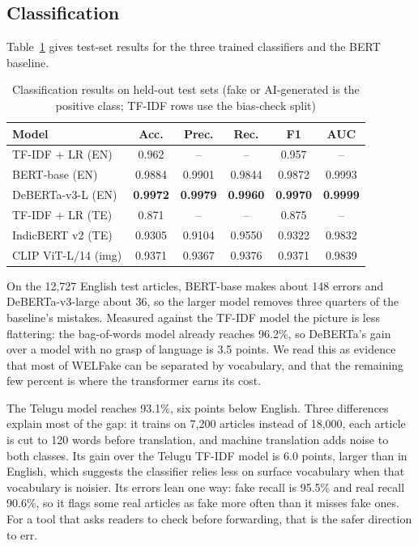 \documentclass[conference]{IEEEtran}
\begin{document}
\subsection{Classification}
Table~\ref{tab:cls} gives test-set results for the three trained classifiers and the BERT baseline.

\begin{table}[t]
\caption{Classification results on held-out test sets (fake or AI-generated is the positive class; TF-IDF rows use the bias-check split)}
\label{tab:cls}
\centering
\footnotesize
\setlength{\tabcolsep}{3.2pt}
\begin{tabular}{@{}lccccc@{}}
\toprule
Model & Acc. & Prec. & Rec. & F1 & AUC \\
\midrule
TF-IDF + LR (EN) & 0.962 & -- & -- & 0.957 & -- \\
BERT-base (EN) & 0.9884 & 0.9901 & 0.9844 & 0.9872 & 0.9993 \\
DeBERTa-v3-L (EN) & \textbf{0.9972} & \textbf{0.9979} & \textbf{0.9960} & \textbf{0.9970} & \textbf{0.9999} \\
\midrule
TF-IDF + LR (TE) & 0.871 & -- & -- & 0.875 & -- \\
IndicBERT v2 (TE) & 0.9305 & 0.9104 & 0.9550 & 0.9322 & 0.9832 \\
\midrule
CLIP ViT-L/14 (img) & 0.9371 & 0.9367 & 0.9376 & 0.9371 & 0.9839 \\
\bottomrule
\end{tabular}
\end{table}

On the 12,727 English test articles, BERT-base makes about 148 errors and DeBERTa-v3-large about 36, so the larger model removes three quarters of the baseline's mistakes. Measured against the TF-IDF model the picture is less flattering: the bag-of-words model already reaches 96.2\%, so DeBERTa's gain over a model with no grasp of language is 3.5 points. We read this as evidence that most of WELFake can be separated by vocabulary, and that the remaining few percent is where the transformer earns its cost.

The Telugu model reaches 93.1\%, six points below English. Three differences explain most of the gap: it trains on 7,200 articles instead of 18,000, each article is cut to 120 words before translation, and machine translation adds noise to both classes. Its gain over the Telugu TF-IDF model is 6.0 points, larger than in English, which suggests the classifier relies less on surface vocabulary when that vocabulary is noisier. Its errors lean one way: fake recall is 95.5\% and real recall 90.6\%, so it flags some real articles as fake more often than it misses fake ones. For a tool that asks readers to check before forwarding, that is the safer direction to err.
\end{document}
